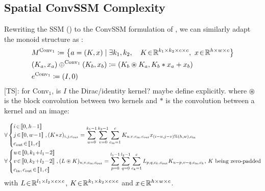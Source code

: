 \documentclass{article}
\newcommand{\TS}[1]{{\color{pink}[TS]: #1}}
\begin{document}
\subsection{Spatial ConvSSM Complexity}
\label{app:Spatial_ConvSSM_complexity}

Rewriting the SSM () to the ConvSSM formulation of , we can similarly adapt the monoid structure as :
\begin{align}
    &M^{\mathrm{Conv}_1}\coloneqq \left\{a = (K, x)\mid \exists k_1, k_2,\quad K\!\in\!\mathbb{R}^{k_1\times k_2\times c\times c},~x\!\in\!\mathbb{R}^{h \times w \times c}\right\}\\
    &(K_a, x_a) \oplus^{\mathrm{Conv}_1} (K_b,x_b)\coloneqq (K_b \circledast K_a, K_b \ast x_a + x_b)\\
    &e^{\mathrm{Conv}_1}\coloneqq(I, 0)
\end{align}
\TS{for Conv$_1$, is $I$ the Dirac/identity kernel? maybe define explicitly.}
\noindent where $\circledast$ is the block convolution between two kernels and $\ast$ is the convolution between a kernel and an image:

\begin{align*}
    & \forall \left\{
\begin{aligned}
    &i\!\in\!\intint{0}{h\!-\!1}\\
    &j\!\in\!\intint{0}{w\!-\!1}\\
    &c_{\mathrm{out}}\!\in\!\intint{1}{c}
\end{aligned}
\right., (K\!\ast\!x)_{i,j,c_{\mathrm{out}}} = \sum_{u=0}^{k_1-1}\sum_{v=0}^{k_2-1}\sum_{c_{\mathrm{in}}=1}^{c} K_{u,v,c_{\mathrm{in}},c_{\mathrm{out}}} x_{(i-u,j-v)\%(h,w),c_{\mathrm{in}}}\\
    & \forall \left\{
\begin{aligned}
    &u\!\in\!\intint{0}{k_1\!+\!l_1\!-\!2}\\
    &v\!\in\!\intint{0}{k_2\!+\!l_2\!-\!2}\\
    &c_{\mathrm{in}},c_{\mathrm{out}}\!\in\!\intint{1}{c}
\end{aligned}
\right., (L \circledast K)_{u,v,c_{\mathrm{in}},c_{\mathrm{out}}} = \sum_{p=0}^{l_1-1}\sum_{q=0}^{l_2-1}\sum_{c_{k}=1}^{c} L_{p,q,c_{k},c_{\mathrm{out}}} K_{u-p,v-q,c_{\mathrm{in}},c_{k}}\text{, $K$ being zero-padded}
\end{align*}
\noindent with $L\!\in\!\mathbb{R}^{l_1\times l_2\times c \times c}$, $K\!\in\!\mathbb{R}^{k_1\times k_2\times c \times c}$ and $x\!\in\!\mathbb{R}^{h \times w \times c}$.
\end{document}
